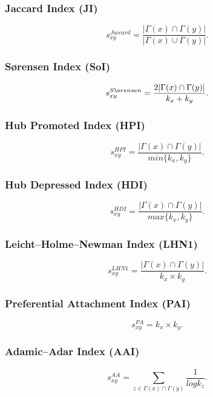 \documentclass{llncs}
\begin{document}
\subsubsection{Jaccard Index (JI)}
%
\begin{equation}
s_{xy}^{Jaccard} = \frac{|\Gamma(x) \cap \Gamma(y)|}{|\Gamma(x) \cup \Gamma(y)|}.
\end{equation}
%
\subsubsection{S{\o}rensen Index (SoI)}
%
\begin{equation}
s_{xy}^{S{\o}rensen} = \frac{2|\Gamma(x) \cap \Gamma(y)|}{k_x + k_y}.
\end{equation}
%
\subsubsection{Hub Promoted Index (HPI)}
%
\begin{equation}
s_{xy}^{HPI} = \frac{|\Gamma(x) \cap \Gamma(y)|}{min\{k_x, k_y\}}.
\end{equation}
%
\subsubsection{Hub Depressed Index (HDI)}
%
\begin{equation}
s_{xy}^{HDI} = \frac{|\Gamma(x) \cap \Gamma(y)|}{max\{k_x, k_y\}}.
\end{equation}
%
\subsubsection{Leicht–Holme–Newman Index (LHN1)}
%
\begin{equation}
s_{xy}^{LHN1} = \frac{|\Gamma(x) \cap \Gamma(y)|}{k_x \times k_y}.
\end{equation}
%
\subsubsection{Preferential Attachment Index (PAI)}
%
\begin{equation}
s_{xy}^{PA} = k_x \times k_y.
\end{equation}
%
\subsubsection{Adamic–Adar Index (AAI)}
%
\begin{equation}
s_{xy}^{AA} = \sum_{z \in \Gamma(x) \cap \Gamma(y)} \frac{1}{log k_z}.
\end{equation}
%
\end{document}
